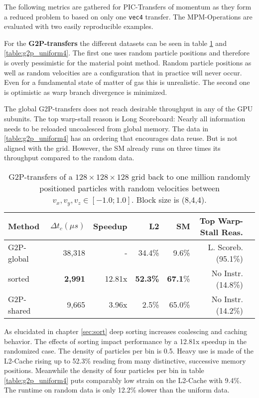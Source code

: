 \documentclass[m,times]{cgMA}
\begin{document}
The following metrics are gathered for PIC-Transfers of momentum as they form a reduced problem to based on only one \texttt{vec4} transfer. The MPM-Operations are evaluated with two easily reproducible examples.

For the \textbf{G2P-transfers} the different datasets can be seen in table \ref{table:g2p_random} and \ref{table:g2p_uniform4}. The first one uses random particle positions and therefore is overly pessimistic for the material point method. Random particle positions as well as random velocities are a configuration that in practice will never occur. Even for a fundamental state of matter of gas this is unrealistic. The second one is optimistic as warp branch divergence is minimized.

The global G2P-transfers does not reach desirable throughput in any of the GPU subunits. The top warp-stall reason is Long Scoreboard: Nearly all information needs to be reloaded uncoalesced from global memory. The data in \ref{table:g2p_uniform4} has an ordering that encourages data reuse. But is not aligned with the grid. However, the SM already runs on three times its throughput compared to the random data.

\begin{table}[htpb]
  \begin{tabular}{ | l | r | r | r | r | r |r|}    \hline
    Method                 &  $\Delta t_c(\mu s)$ &Speedup         & L2    &SM     &Top Warp-Stall Reas. \\\hline
    G2P-global             &   38,318             &-               &34.4\% & 9.6\% &L. Scoreb.(95.1\%)  \\\hline
    sorted                 &    \textbf{2,991}    &12.81x          &\textbf{52.3\%}&\textbf{67.1}\% &No Instr.(14.8\%)   \\\hline
    G2P-shared             &    9,665             & 3.96x          & 2.5\% &65.0\% &No Instr.(14.2\%)\\\hline
 \end{tabular}
 \caption{G2P-transfers of a $128\times 128\times128$ grid back to one million randomly positioned particles with random velocities between $v_x,v_y,v_z \in [-1.0;1.0]$. Block size is (8,4,4).}\label{table:g2p_random}
\end{table}

As elucidated in chapter \ref{sec:sort} deep sorting increases coalescing and caching behavior. The effects of sorting impact performance by a 12.81x speedup in the randomized case. The density of particles per bin is 0.5. Heavy use is made of the L2-Cache rising up to 52.3\% reading from many distinctive, successive memory positions. Meanwhile the density of four particles per bin in table \ref{table:g2p_uniform4} puts comparably low strain on the L2-Cache with 9.4\%. The runtime on random data is only 12.2\% slower than the uniform data.
\end{document}
